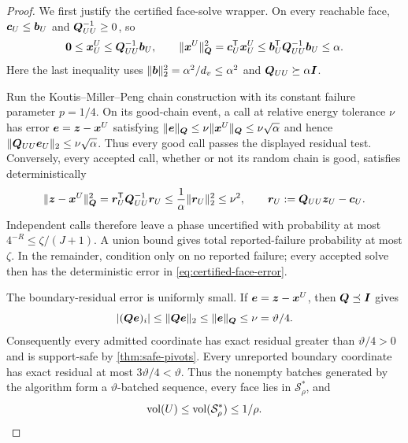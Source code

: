 \begin{proof}
We first justify the certified face-solve wrapper.  On every reachable face,
$\bm{c}_U\leq\bm{b}_U$ and $\bm{Q}_{UU}^{-1}\geq0$, so
\begin{equation}
 \bm{0}\leq\bm{x}_U^U\leq\bm{Q}_{UU}^{-1}\bm{b}_U,
 \qquad
 \lVert\bm{x}^U\rVert_{\bm{Q}}^2
 =\bm{c}_U^{\mathsf{T}}\bm{x}_U^U
 \leq\bm{b}_U^{\mathsf{T}}\bm{Q}_{UU}^{-1}\bm{b}_U
 \leq\alpha.
 \label{eq:face-solution-energy}
\end{equation}
Here the last inequality uses
$\lVert\bm{b}\rVert_2^2=\alpha^2/d_v\leq\alpha^2$ and
$\bm{Q}_{UU}\succeq\alpha\bm{I}$.

Run the Koutis--Miller--Peng chain construction with its constant failure
parameter $p=1/4$.  On its good-chain event, a call at relative energy
tolerance $\nu$ has error $\bm{e}=\bm{z}-\bm{x}^U$ satisfying
$\lVert\bm{e}\rVert_{\bm{Q}}\leq\nu\lVert\bm{x}^U\rVert_{\bm{Q}}
\leq\nu\sqrt\alpha$ and hence
$\lVert\bm{Q}_{UU}\bm{e}_U\rVert_2\leq\nu\sqrt\alpha$.  Thus every good call passes the
displayed residual test.  Conversely, every accepted call, whether or not its
random chain is good, satisfies deterministically
\begin{equation}
 \lVert\bm{z}-\bm{x}^U\rVert_{\bm{Q}}^2
 =\bm{r}_U^{\mathsf{T}}\bm{Q}_{UU}^{-1}\bm{r}_U
 \leq\frac1\alpha\lVert\bm{r}_U\rVert_2^2
 \leq\nu^2,
 \qquad
 \bm{r}_U:=\bm{Q}_{UU}\bm{z}_U-\bm{c}_U.
 \label{eq:certified-face-error}
\end{equation}
Independent calls therefore leave a phase uncertified with probability at
most $4^{-R}\leq\zeta/(J+1)$.  A union bound gives total reported-failure
probability at most $\zeta$.  In the remainder, condition only on no reported
failure; every accepted solve then has the deterministic error in
\cref{eq:certified-face-error}.

The boundary-residual error is uniformly small.  If
$\bm{e}=\bm{z}-\bm{x}^U$, then $\bm{Q}\preceq\bm{I}$ gives
\begin{equation}
 |(\bm{Q}\bm{e})_i|\leq\lVert\bm{Q}\bm{e}\rVert_2
 \leq\lVert\bm{e}\rVert_{\bm{Q}}\leq\nu=\vartheta/4.
 \label{eq:batch-boundary-error}
\end{equation}
Consequently every admitted coordinate has exact residual greater than
$\vartheta/4>0$ and is support-safe by \cref{thm:safe-pivots}.  Every
unreported boundary coordinate has exact residual at most
$3\vartheta/4<\vartheta$.  Thus the nonempty batches generated by the
algorithm form a $\vartheta$-batched sequence, every face lies in
$\mathcal S_\rho^*$, and
\begin{equation}
 \operatorname{vol}(U)\leq\operatorname{vol}(\mathcal S_\rho^*)\leq1/\rho.
 \label{eq:batch-face-volume}
\end{equation}


\end{proof}
